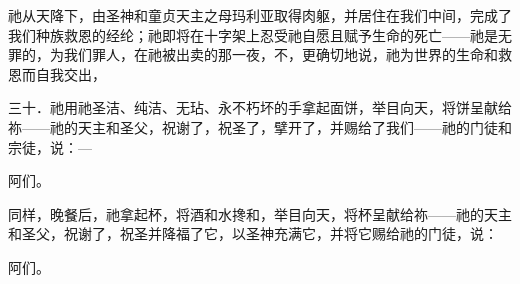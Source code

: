 祂从天降下，由圣神和童贞天主之母玛利亚取得肉躯，并居住在我们中间，完成了我们种族救恩的经纶；祂即将在十字架上忍受祂自愿且赋予生命的死亡——祂是无罪的，为我们罪人，在祂被出卖的那一夜，不，更确切地说，祂为世界的生命和救恩而自我交出，\par

\par

三十．祂用祂圣洁、纯洁、无玷、永不朽坏的手拿起面饼，举目向天，将饼呈献给祢——祂的天主和圣父，祝谢了，祝圣了，擘开了，并赐给了我们——祂的门徒和宗徒，说：—\par

\par

\par

\par

\par

\par

阿们。\par

\par

同样，晚餐后，祂拿起杯，将酒和水搀和，举目向天，将杯呈献给祢——祂的天主和圣父，祝谢了，祝圣并降福了它，以圣神充满它，并将它赐给祂的门徒，说：\par

\par

阿们。\par

\par

\par

\par

\par

\par

\par

